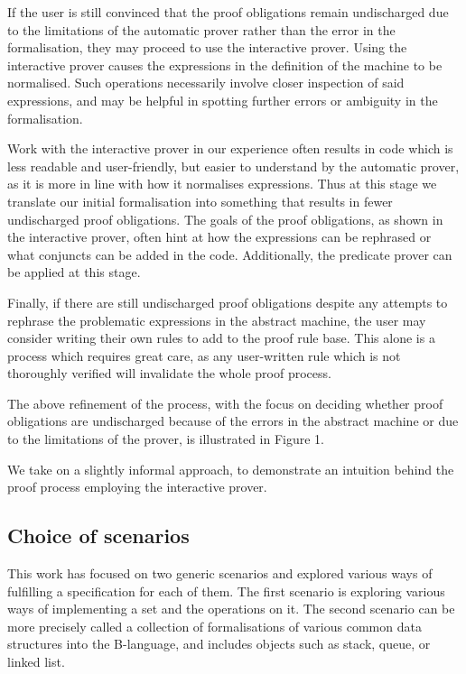 \documentclass[12pt,journal,duplex]{IEEEtran}
\begin{document}
	If the user is still convinced that the proof obligations remain undischarged due to the limitations of the automatic prover rather than the error in the formalisation, they may proceed to use the interactive prover. Using the interactive prover causes the expressions in the definition of the machine to be normalised. Such operations necessarily involve closer inspection of said expressions, and may be helpful in spotting further errors or ambiguity in the formalisation.

	Work with the interactive prover in our experience often results in code which is less readable and user-friendly, but easier to understand by the automatic prover, as it is more in line with how it normalises expressions. Thus at this stage we translate our initial formalisation into something that results in fewer undischarged proof obligations. The goals of the proof obligations, as shown in the interactive prover, often hint at how the expressions can be rephrased or what conjuncts can be added in the code. Additionally, the predicate prover can be applied at this stage.

	Finally, if there are still undischarged proof obligations despite any attempts to rephrase the problematic expressions in the abstract machine, the user may consider writing their own rules to add to the proof rule base. This alone is a process which requires great care, as any user-written rule which is not thoroughly verified will invalidate the whole proof process.

	The above refinement of the process, with the focus on deciding whether proof obligations are undischarged because of the errors in the abstract machine or due to the limitations of the prover, is illustrated in Figure 1.

	We take on a slightly informal approach, to demonstrate an intuition behind the proof process employing the interactive prover.

	\subsection{Choice of scenarios}
	This work has focused on two generic scenarios and explored various ways of fulfilling a specification for each of them. The first scenario is exploring various ways of implementing a set and the operations on it. The second scenario can be more precisely called a collection of formalisations of various common data structures into the B-language, and includes objects such as stack, queue, or linked list.
\end{document}
